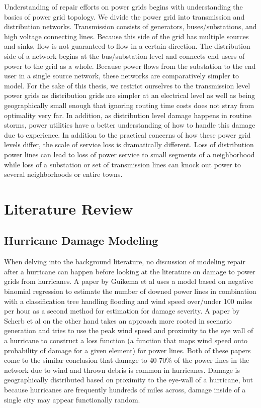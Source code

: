 \documentclass{article}
\begin{document}
	Understanding of repair efforts on power grids begins with understanding the basics of power grid topology. We divide the power grid into transmission and distribution networks. Transmission consists of generators, buses/substations, and high voltage connecting lines. Because this side of the grid has multiple sources and sinks, flow is not guaranteed to flow in a certain direction. The distribution side of a network begins at the bus/substation level and connects end users of power to the grid as a whole. Because power flows from the substation to the end user in a single source network, these networks are comparatively simpler to model. For the sake of this thesis, we restrict ourselves to the transmission level power grids as distribution grids are simpler at an electrical level as well as being geographically small enough that ignoring routing time costs does not stray from optimality very far. In addition, as distribution level damage happens in routine storms, power utilities have a better understanding of how to handle this damage due to experience. In addition to the practical concerns of how these power grid levels differ, the scale of service loss is dramatically different. Loss of distribution power lines can lead to loss of power service to small segments of a neighborhood while loss of a substation or set of transmission lines can knock out power to several neighborhoods or entire towns.
	
	
	\section{Literature Review}
	\subsection{Hurricane Damage Modeling}
		When delving into the background literature, no discussion of modeling repair after a hurricane can happen before looking at the literature on damage to power grids from hurricanes. A paper by Guikema et al\cite{GuikemaEA2010} uses a model based on negative binomial regression to estimate the number of downed power lines in combination with a classification tree handling flooding and wind speed over/under 100 miles per hour as a second method for estimation for damage severity. A paper by Scherb et al \cite{ScherbEA2015} on the other hand takes an approach more rooted in scenario generation and tries to use the peak wind speed and proximity to the eye wall of a hurricane to construct a loss function (a function that maps wind speed onto probability of damage for a given element) for power lines. Both of these papers come to the similar conclusion that damage to 40-70\% of the power lines in the network due to wind and thrown debris is common in hurricanes. Damage is geographically distributed based on proximity to the eye-wall of a hurricane, but because hurricanes are frequently hundreds of miles across, damage inside of a single city may appear functionally random. 
		
\end{document}
